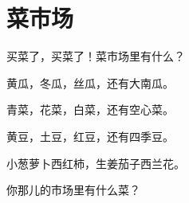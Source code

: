 \documentclass[12pt,UTF-8,openany]{ctexbook}
\begin{document}
\hanzibox{}\hanzibox{}\hanzibox{}\hanzibox{}\hspace{1em}\hanzibox{}\hanzibox{}\hanzibox{}\hanzibox{}

\hanzibox{}\hanzibox{}\hanzibox{}\hanzibox{}\hspace{1em}\hanzibox{}\hanzibox{}\hanzibox{}\hanzibox{}

\hanzibox{}\hanzibox{}\hanzibox{}\hanzibox{}\hspace{1em}\hanzibox{}\hanzibox{}\hanzibox{}\hanzibox{}

\hanzibox{}\hanzibox{}\hanzibox{}\hanzibox{}\hspace{1em}\hanzibox{}\hanzibox{}\hanzibox{}\hanzibox{}

\hanzibox{}\hanzibox{}\hanzibox{}\hanzibox{}\hspace{1em}\hanzibox{}\hanzibox{}\hanzibox{}\hanzibox{}






\chapter{菜市场}

\begin{large}
    
    买菜了，买菜了！菜市场里有什么？
    
    黄瓜，冬瓜，丝瓜，还有大南瓜。
    
    青菜，花菜，白菜，还有空心菜。
    
    黄豆，土豆，红豆，还有四季豆。
    
    小葱萝卜西红柿，生姜茄子西兰花。
    
    你那儿的市场里有什么菜？
    
\end{large}


\clearpage

\begin{center}
    
    
\end{center}


\hanzibox{}\hanzibox{}\hanzibox{}\hanzibox{}\hspace{1em}\hanzibox{}\hanzibox{}\hanzibox{}\hanzibox{}
\end{document}
